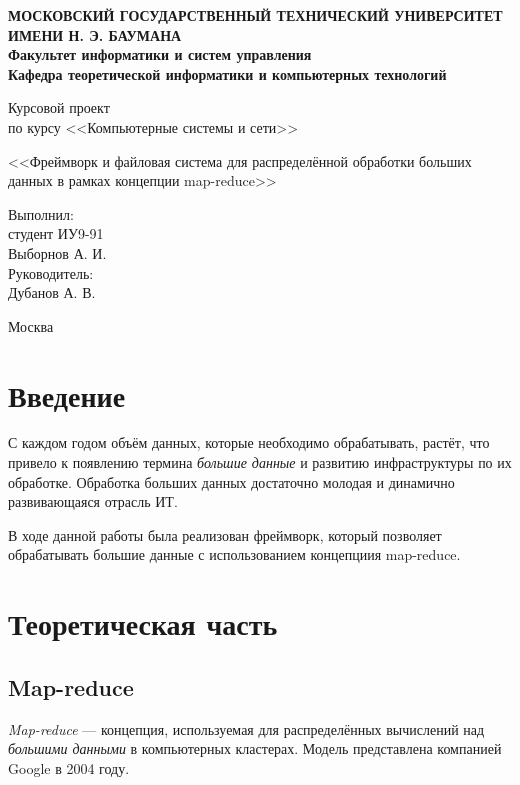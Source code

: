 \documentclass[12pt,a4paper,oneside]{extarticle}
\begin{document}
\pgfplotsset{compat=1.8}

\thispagestyle{empty}
\newpage
{
\centering


\textbf{
МОСКОВСКИЙ ГОСУДАРСТВЕННЫЙ ТЕХНИЧЕСКИЙ УНИВЕРСИТЕТ ИМЕНИ Н. Э. БАУМАНА \\
Факультет информатики и систем управления \\
Кафедра теоретической информатики и компьютерных технологий}
\bigskip
\bigskip
\bigskip
\bigskip
\bigskip
\bigskip
\bigskip

\vfill


Курсовой проект \\
по курсу <<Компьютерные системы и сети>>

\bigskip

{\large <<Фреймворк и файловая система для распределённой обработки больших данных в рамках концепции map-reduce>>}
\bigskip

\vfill



\hfill\parbox{4cm} {
Выполнил:\\
студент ИУ9-91 \hfill \\
Выборнов А. И.\hfill \medskip\\
Руководитель:\\
Дубанов А. В.\hfill
}


\vspace{\fill}

Москва \number\year
\clearpage
}


\tableofcontents

\clearpage


\section*{Введение}
   С каждом годом объём данных, которые необходимо обрабатывать, растёт, что привело к появлению термина {\it большие данные} и развитию инфраструктуры по их обработке. Обработка больших данных достаточно молодая и динамично развивающаяся отрасль ИТ.

   В ходе данной работы была реализован фреймворк, который позволяет обрабатывать большие данные с использованием концепциия map-reduce.
\clearpage

\section{Теоретическая часть}
    \subsection{Map-reduce}
        {\it Map-reduce} --- концепция, используемая для распределённых вычислений над {\it большими данными} в компьютерных кластерах. Модель представлена компанией Google в 2004 году.
\end{document}
